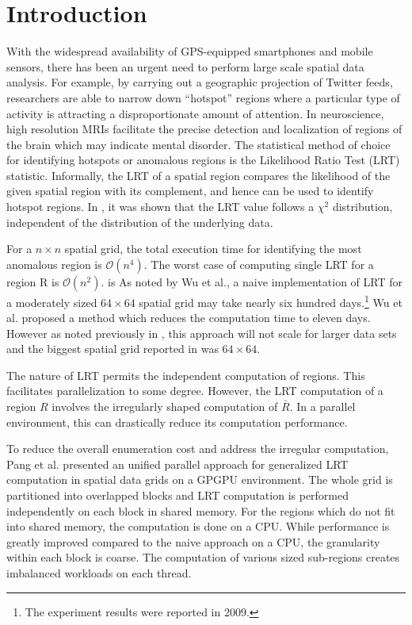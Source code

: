 \documentclass[AMA,LATO1COL]{WileyNJD-v2}
\newcommand\bigo{\mathcal O}
\begin{document}
\maketitle

\section{Introduction}\label{sec1}
With the widespread availability of GPS-equipped smartphones and mobile
sensors, there has been an urgent need to perform large scale spatial data analysis.
For example, by carrying
out a geographic projection of Twitter feeds, researchers are able to
narrow down ``hotspot'' regions where a particular type of activity is attracting a disproportionate  amount of attention. In neuroscience, high resolution MRIs facilitate the precise detection and localization of regions of the brain which may indicate mental disorder.
The statistical method of choice for identifying hotspots or anomalous regions
is the Likelihood Ratio Test (LRT) statistic.
Informally, the LRT of a spatial region compares the likelihood of the given spatial region with its complement, and hence can be used to identify hotspot regions. In \cite{chisquare}, it was shown that the LRT value follows a $\chi^{2}$ distribution, independent of the distribution of the underlying data.

\noindent For a $n\times n$ spatial grid, the total execution time for identifying the most
anomalous region is $\bigo(n^4)$. The worst case of computing
single LRT for a region R is $\bigo(n^2)$. is As noted by Wu et al.\cite{jour}, a naive implementation of LRT for a moderately sized $64 \times 64$  spatial grid may take nearly six hundred days.\footnote{The experiment results were  reported in  2009.} Wu et al.\cite{jour} proposed a method which reduces the computation time to eleven days. However as noted previously in \cite{ADMA}, this approach will not scale for larger data sets and the biggest spatial grid reported in\cite{jour} was $64 \times  64$.

\noindent The nature of LRT permits the independent computation of regions. This facilitates parallelization to some degree. However, the LRT computation of a region $R$ involves the irregularly shaped computation of $\bar R$\cite{apweb}. In a parallel environment, this can drastically reduce its computation performance\cite{irregular1,irregular2,irregular3}.

\noindent To reduce the overall enumeration cost and address the irregular computation, Pang et al.\cite{apweb} presented an unified parallel approach for generalized LRT computation in spatial data grids on a GPGPU environment. The whole grid is partitioned into overlapped blocks and LRT computation is performed independently on each block in shared memory. For the regions which do not fit into shared memory, the computation is done on a CPU. While performance is greatly improved compared to the naive approach on a CPU, the granularity within each block is coarse. The computation of various sized sub-regions creates imbalanced workloads on each thread.
\end{document}
